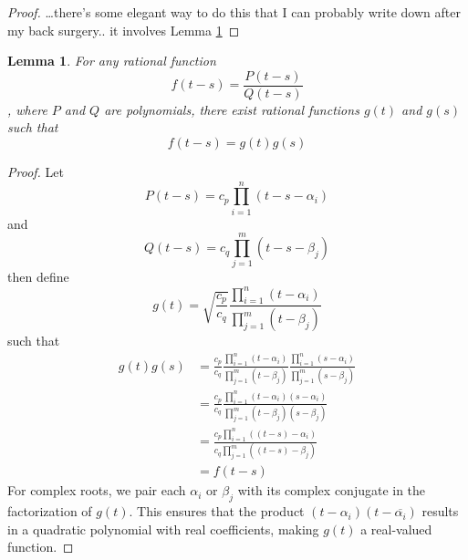 \documentclass{article}
\newtheorem{lemma}{Lemma}
\begin{document}
\begin{proof}
\ldots there's some elegant way to do this that I can probably write down
after my back surgery.. it involves Lemma \ref{factorize}
\end{proof}

\begin{lemma}
\label{factorize}For any rational function
\begin{equation}
f (t - s) = \frac{P (t - s)}{Q (t - s)}
\end{equation}
, where $P$ and $Q$ are polynomials, there exist rational functions $g (t)$
and $g (s)$ such that
\begin{equation}
f (t - s) = g (t) g (s)
\end{equation}
\end{lemma}

\begin{proof}
Let
\begin{equation}
P (t - s) = c_p \prod_{i = 1}^n (t - s - \alpha_i)
\end{equation}
and
\begin{equation}
Q (t - s) = c_q \prod_{j = 1}^m (t - s - \beta_j)
\end{equation}
then define
\begin{equation}
g (t) = \sqrt{\frac{c_p}{c_q}} \frac{\prod_{i = 1}^n (t -
\alpha_i)}{\prod_{j = 1}^m (t - \beta_j)}
\end{equation}
such that
\begin{equation}
\begin{array}{ll}
g (t) g (s) & = \frac{c_p}{c_q} \frac{\prod_{i = 1}^n (t -
\alpha_i)}{\prod_{j = 1}^m (t - \beta_j)} \frac{\prod_{i = 1}^n (s -
\alpha_i)}{\prod_{j = 1}^m (s - \beta_j)}\\
& = \frac{c_p}{c_q} \frac{\prod_{i = 1}^n (t - \alpha_i) (s -
\alpha_i)}{\prod_{j = 1}^m (t - \beta_j) (s - \beta_j)}\\
& = \frac{c_p \prod_{i = 1}^n ((t - s) - \alpha_i)}{c_q \prod_{j =
1}^m ((t - s) - \beta_j)}\\
& = f (t - s)
\end{array}
\end{equation}
For complex roots, we pair each $\alpha_i$ or $\beta_j$ with its complex
conjugate in the factorization of $g (t)$. This ensures that the product $(t
- \alpha_i) (t - \overline{\alpha_i})$ results in a quadratic polynomial
with real coefficients, making $g (t)$ a real-valued function.
\end{proof}
\end{document}
